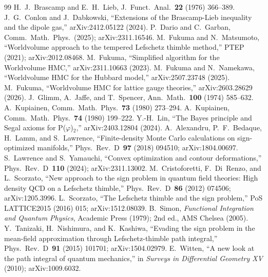 \documentclass[12pt]{article}
\theoremstyle{definition}
\theoremstyle{remark}
\newcommand{\ph}{\varphi}
\begin{document}
\begin{thebibliography}{99}
 H.~J.~Brascamp and E.~H.~Lieb,
  J.~Funct.~Anal.~\textbf{22} (1976) 366--389.
 J.~G.~Conlon and J.~Dabkowski,
  ``Extensions of the Brascamp-Lieb inequality and the dipole gas,''
  arXiv:2412.05122 (2024).
 P.~Dario and C.~Garban,
  Comm.~Math.~Phys.~(2025); arXiv:2311.16546.
 M.~Fukuma and N.~Matsumoto,
  ``Worldvolume approach to the tempered Lefschetz thimble method,''
  PTEP (2021); arXiv:2012.08468.
 M.~Fukuma,
  ``Simplified algorithm for the Worldvolume HMC,''
  arXiv:2311.10663 (2023).
 M.~Fukuma and N.~Namekawa,
  ``Worldvolume HMC for the Hubbard model,''
  arXiv:2507.23748 (2025).
 M.~Fukuma,
  ``Worldvolume HMC for lattice gauge theories,''
  arXiv:2603.28629 (2026).
 J.~Glimm, A.~Jaffe, and T.~Spencer,
  Ann.~Math.~\textbf{100} (1974) 585--632.
 A.~Kupiainen,
  Comm.~Math.~Phys.~\textbf{73} (1980) 273--294.
 A.~Kupiainen,
  Comm.~Math.~Phys.~\textbf{74} (1980) 199--222.
 Y.-H.~Lin,
  ``The Bayes principle and Segal axioms for P($\ph$)$_2$,''
  arXiv:2403.12804 (2024).
 A.~Alexandru, P.~F.~Bedaque, H.~Lamm, and S.~Lawrence,
  ``Finite-density Monte Carlo calculations on sign-optimized manifolds,''
  Phys.~Rev.~D~\textbf{97} (2018) 094510; arXiv:1804.00697.
 S.~Lawrence and S.~Yamauchi,
  ``Convex optimization and contour deformations,''
  Phys.~Rev.~D~\textbf{110} (2024); arXiv:2311.13002.
 M.~Cristoforetti, F.~Di~Renzo, and L.~Scorzato,
  ``New approach to the sign problem in quantum field theories:
  High density QCD on a Lefschetz thimble,''
  Phys.~Rev.~D~\textbf{86} (2012) 074506; arXiv:1205.3996.
 L.~Scorzato,
  ``The Lefschetz thimble and the sign problem,''
  PoS LATTICE2015 (2016) 015; arXiv:1512.08039.
 B.~Simon,
  \emph{Functional Integration and Quantum Physics},
  Academic Press (1979); 2nd ed., AMS Chelsea (2005).
 Y.~Tanizaki, H.~Nishimura, and K.~Kashiwa,
  ``Evading the sign problem in the mean-field approximation
  through Lefschetz-thimble path integral,''
  Phys.~Rev.~D~\textbf{91} (2015) 101701; arXiv:1504.02979.
 E.~Witten,
  ``A new look at the path integral of quantum mechanics,''
  in \emph{Surveys in Differential Geometry XV} (2010); arXiv:1009.6032.
\end{thebibliography}
\end{document}
